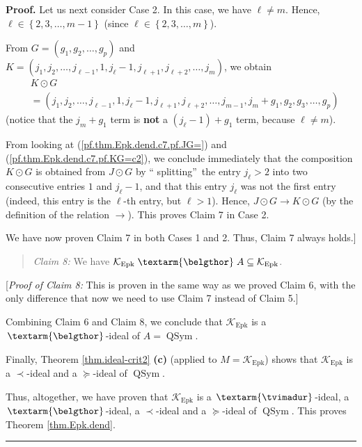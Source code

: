 \documentclass[numbers=enddot,12pt,final,onecolumn,notitlepage]{scrartcl}%
\theoremstyle{definition}
\newenvironment{statement}{\begin{quote}}{\end{quote}}
\newenvironment{proof}[1][Proof]{\noindent\textbf{#1.} }{\ \rule{0.5em}{0.5em}}
\newcommand{\tvi}{\left. \textarm{\tvimadur} \right.}
\newcommand{\bel}{\left. \textarm{\belgthor} \right.}
\begin{document}
\begin{proof}
Let us next consider Case 2. In this case, we have $\ell\neq m$. Hence,
$\ell\in\left\{  2,3,\ldots,m-1\right\}  $ (since $\ell\in\left\{
2,3,\ldots,m\right\}  $).

From $G=\left(  g_{1},g_{2},\ldots,g_{p}\right)  $ and $K=\left(  j_{1}%
,j_{2},\ldots,j_{\ell-1},1,j_{\ell}-1,j_{\ell+1},j_{\ell+2},\ldots
,j_{m}\right)  $, we obtain%
\begin{align}
&  K\odot G\nonumber\\
&  =\left(  j_{1},j_{2},\ldots,j_{\ell-1},1,j_{\ell}-1,j_{\ell+1},j_{\ell
+2},\ldots,j_{m-1},j_{m}+g_{1},g_{2},g_{3},\ldots,g_{p}\right)
\label{pf.thm.Epk.dend.c7.pf.KG=c2}%
\end{align}
(notice that the $j_{m}+g_{1}$ term is \textbf{not} a $\left(  j_{\ell
}-1\right)  +g_{1}$ term, because $\ell\neq m$).

From looking at (\ref{pf.thm.Epk.dend.c7.pf.JG=}) and
(\ref{pf.thm.Epk.dend.c7.pf.KG=c2}), we conclude immediately that the
composition $K\odot G$ is obtained from $J\odot G$ by \textquotedblleft
splitting\textquotedblright\ the entry $j_{\ell}>2$ into two consecutive
entries $1$ and $j_{\ell}-1$, and that this entry $j_{\ell}$ was not the first
entry (indeed, this entry is the $\ell$-th entry, but $\ell>1$). Hence,
$J\odot G\rightarrow K\odot G$ (by the definition of the relation
$\rightarrow$). This proves Claim 7 in Case 2.

We have now proven Claim 7 in both Cases 1 and 2. Thus, Claim 7 always holds.]

\begin{statement}
\textit{Claim 8:} We have $\mathcal{K}_{\operatorname*{Epk}}\bel
A\subseteq\mathcal{K}_{\operatorname*{Epk}}$.
\end{statement}

[\textit{Proof of Claim 8:} This is proven in the same way as we proved Claim
6, with the only difference that now we need to use Claim 7 instead of Claim 5.]

Combining Claim 6 and Claim 8, we conclude that $\mathcal{K}%
_{\operatorname*{Epk}}$ is a $\bel  $-ideal of $A=\operatorname*{QSym}$.

Finally, Theorem \ref{thm.ideal-crit2} \textbf{(c)} (applied to $M=\mathcal{K}%
_{\operatorname*{Epk}}$) shows that $\mathcal{K}_{\operatorname*{Epk}}$ is a
$\left.  \prec\right.  $-ideal and a $\left.  \succeq\right.  $-ideal of
$\operatorname*{QSym}$.

Thus, altogether, we have proven that $\mathcal{K}_{\operatorname*{Epk}}$ is a
$\tvi$-ideal, a $\bel$-ideal, a $\left.  \prec\right.  $-ideal and a $\left.
\succeq\right.  $-ideal of $\operatorname*{QSym}$. This proves Theorem
\ref{thm.Epk.dend}.
\end{proof}
\end{document}
